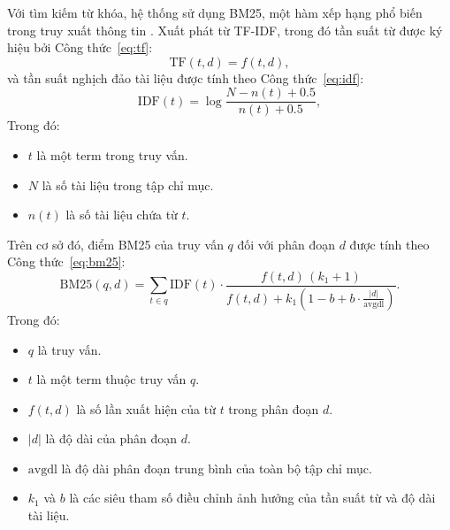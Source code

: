 \documentclass[../DoAn.tex]{subfiles}
\begin{document}
Với tìm kiếm từ khóa, hệ thống sử dụng BM25, một hàm xếp hạng phổ biến trong truy xuất thông tin \cite{robertson2009bm25}. Xuất phát từ TF-IDF, trong đó tần suất từ được ký hiệu bởi Công thức~\ref{eq:tf}:
\begin{equation}
\mathrm{TF}(t, d) = f(t, d),
\label{eq:tf}
\end{equation}
và tần suất nghịch đảo tài liệu được tính theo Công thức~\ref{eq:idf}:
\begin{equation}
\mathrm{IDF}(t) = \log \frac{N - n(t) + 0.5}{n(t) + 0.5},
\label{eq:idf}
\end{equation}
Trong đó:\\
\begin{itemize}
\item $t$ là một term trong truy vấn.
\item $N$ là số tài liệu trong tập chỉ mục.
\item $n(t)$ là số tài liệu chứa từ $t$.
\end{itemize}
Trên cơ sở đó, điểm BM25 của truy vấn $q$ đối với phân đoạn $d$ được tính theo Công thức~\ref{eq:bm25}:
\begin{equation}
\mathrm{BM25}(q,d)=\sum_{t \in q} \mathrm{IDF}(t)\cdot
\frac{f(t,d)\,(k_1+1)}
{f(t,d)+k_1\left(1-b+b\cdot \frac{|d|}{\mathrm{avgdl}}\right)}.
\label{eq:bm25}
\end{equation}
Trong đó:\\
\begin{itemize}
\item $q$ là truy vấn.
\item $t$ là một term thuộc truy vấn $q$.
\item $f(t,d)$ là số lần xuất hiện của từ $t$ trong phân đoạn $d$.
\item $|d|$ là độ dài của phân đoạn $d$.
\item $\mathrm{avgdl}$ là độ dài phân đoạn trung bình của toàn bộ tập chỉ mục.
\item $k_1$ và $b$ là các siêu tham số điều chỉnh ảnh hưởng của tần suất từ và độ dài tài liệu.
\end{itemize}
\end{document}
